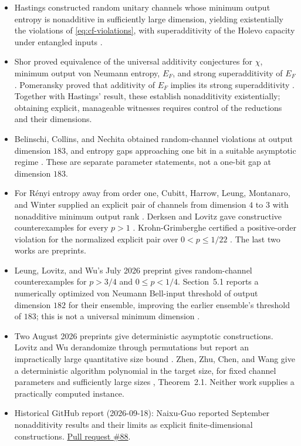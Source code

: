\begin{itemize}
  \item Hastings constructed random unitary channels whose minimum output entropy is nonadditive in sufficiently large dimension, yielding existentially the violations of \eqref{eq:cf-violations}, with superadditivity of the Holevo capacity under entangled inputs .

  \item Shor proved equivalence of the universal additivity conjectures for $\chi$, minimum output von Neumann entropy, $E_F$, and strong superadditivity of $E_F$ . Pomeransky proved that additivity of $E_F$ implies its strong superadditivity . Together with Hastings' result, these establish nonadditivity existentially; obtaining explicit, manageable witnesses requires control of the reductions and their dimensions.

  \item Belinschi, Collins, and Nechita obtained random-channel violations at output dimension $183$, and entropy gaps approaching one bit in a suitable asymptotic regime . These are separate parameter statements, not a one-bit gap at dimension $183$.

  \item For R\'enyi entropy away from order one, Cubitt, Harrow, Leung, Montanaro, and Winter supplied an explicit pair of channels from dimension $4$ to $3$ with nonadditive minimum output rank . Derksen and Lovitz gave constructive counterexamples for every $p>1$ . Krohn-Grimberghe certified a positive-order violation for the normalized explicit pair over $0<p\le1/22$ . The last two works are preprints.

  \item Leung, Lovitz, and Wu's July 2026 preprint gives random-channel counterexamples for $p>3/4$ and $0\le p<1/4$. Section~5.1 reports a numerically optimized von Neumann Bell-input threshold of output dimension $182$ for their ensemble, improving the earlier ensemble's threshold of $183$; this is not a universal minimum dimension .

  \item Two August 2026 preprints give deterministic asymptotic constructions. Lovitz and Wu derandomize through permutations but report an impractically large quantitative size bound . Zhen, Zhu, Chen, and Wang give a deterministic algorithm polynomial in the target size, for fixed channel parameters and sufficiently large sizes , Theorem~2.1. Neither work supplies a practically computed instance.

  \item Historical GitHub report (2026-09-18): Naixu-Guo reported September nonadditivity results and their limits as explicit finite-dimensional constructions. \href{https://github.com/Naixu-Guo/quantum-open-problems/pull/88}{Pull request \#88}.
\end{itemize}

